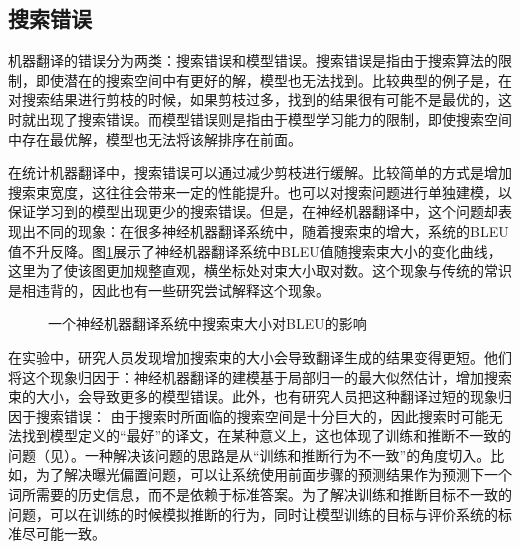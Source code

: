 
\subsection{搜索错误}

\parinterval 机器翻译的错误分为两类：搜索错误和模型错误。搜索错误是指由于搜索算法的限制，即使潜在的搜索空间中有更好的解，模型也无法找到。比较典型的例子是，在对搜索结果进行剪枝的时候，如果剪枝过多，找到的结果很有可能不是最优的，这时就出现了搜索错误。而模型错误则是指由于模型学习能力的限制，即使搜索空间中存在最优解，模型也无法将该解排序在前面。

\parinterval 在统计机器翻译中，搜索错误可以通过减少剪枝进行缓解。比较简单的方式是增加搜索束宽度，这往往会带来一定的性能提升。也可以对搜索问题进行单独建模，以保证学习到的模型出现更少的搜索错误。但是，在神经机器翻译中，这个问题却表现出不同的现象：在很多神经机器翻译系统中，随着搜索束的增大，系统的BLEU值不升反降。图\ref{fig:14-3}展示了神经机器翻译系统中BLEU值随搜索束大小的变化曲线，这里为了使该图更加规整直观，横坐标处对束大小取对数。这个现象与传统的常识是相违背的，因此也有一些研究尝试解释这个现象。

\begin{figure}[htp]
\centering
 
\caption{一个神经机器翻译系统中搜索束大小对BLEU的影响}
\label{fig:14-3}
\end{figure}
\parinterval 在实验中，研究人员发现增加搜索束的大小会导致翻译生成的结果变得更短。他们将这个现象归因于：神经机器翻译的建模基于局部归一的最大似然估计，增加搜索束的大小，会导致更多的模型错误。此外，也有研究人员把这种翻译过短的现象归因于搜索错误： 由于搜索时所面临的搜索空间是十分巨大的，因此搜索时可能无法找到模型定义的“最好”的译文，在某种意义上，这也体现了训练和推断不一致的问题（见{\chapterthirteen}）。一种解决该问题的思路是从“训练和推断行为不一致”的角度切入。比如，为了解决曝光偏置问题，可以让系统使用前面步骤的预测结果作为预测下一个词所需要的历史信息，而不是依赖于标准答案。为了解决训练和推断目标不一致的问题，可以在训练的时候模拟推断的行为，同时让模型训练的目标与评价系统的标准尽可能一致。

